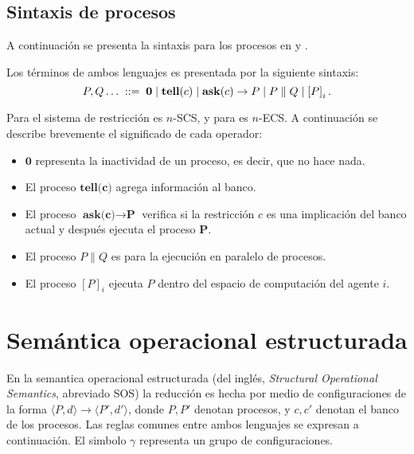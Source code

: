 \subsection{Sintaxis de procesos}
\label{spr.sccp}

A continuaci\'on se presenta la sintaxis para los procesos en \textbf{\SCCP} y \textbf{\ECCP}.

\theoremstyle{definition}
\begin{definition}%
Los t\'erminos de ambos lenguajes es presentada por la siguiente sintaxis: \[P,Q\ldots \; ::= \;\Stop\mid \tell(c) \mid \ask(c)\rightarrow P \mid P \parallel Q  \mid \K i P.\]
\end{definition}

Para \textbf{\SCCP} el sistema de restricci\'on es $n$-SCS, y para \textbf{\ECCP} es $n$-ECS. A continuaci\'on se describe brevemente el significado de cada operador:

\begin{itemize}
	\item $\textbf{0}$ representa la inactividad de un proceso, es decir, que no hace nada.
	\item El proceso $\textbf{tell(c)}$ agrega informaci\'on al banco.
	\item El proceso $\textbf{ask(c)} \rightarrow \textbf{P}$ verifica si la restricci\'on $c$ es una implicaci\'on del banco actual y 	despu\'es ejecuta el proceso $\textbf{P}$.
	\item El proceso $P\|Q$ es para la ejecuci\'on en paralelo de procesos.
	\item El proceso $[P]_i$ ejecuta $P$ dentro del espacio de computaci\'on del agente $i$.
\end{itemize}


\section{Sem\'antica operacional estructurada}
\label{soe.sccp}

En la semantica operacional estructurada (del ingl\'es, \textit{Structural Operational Semantics}, abreviado SOS) 
la reducci\'on es hecha por medio de configuraciones de la forma $\langle P,d\rangle \rightarrow \langle P',d'\rangle$, donde $P,P'$ denotan procesos, y $c,c'$ denotan el banco de los procesos. Las reglas comunes entre ambos lenguajes se expresan a continuaci\'on. El simbolo $\gamma$ representa un grupo de configuraciones.

